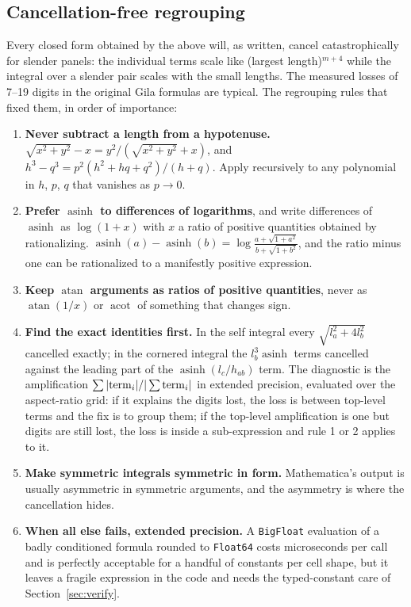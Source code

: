 \documentclass[11pt]{article}
\theoremstyle{remark}
\newcommand{\asinh}{\operatorname{asinh}}
\newcommand{\atan}{\operatorname{atan}}
\newcommand{\code}[1]{\texttt{#1}}
\begin{document}
\subsection{Cancellation-free regrouping}
\label{sec:regroup}

Every closed form obtained by the above will, as written, cancel catastrophically for
slender panels: the individual terms scale like (largest length)$^{m+4}$ while the
integral over a slender pair scales with the small lengths. The measured losses of
7--19 digits in the original Gila formulas are typical. The regrouping rules that
fixed them, in order of importance:
\begin{enumerate}[nosep]
\item \textbf{Never subtract a length from a hypotenuse.} $\sqrt{x^2+y^2} - x =
y^2/(\sqrt{x^2+y^2}+x)$, and $h^3 - q^3 = p^2(h^2+hq+q^2)/(h+q)$. Apply recursively
to any polynomial in $h$, $p$, $q$ that vanishes as $p\to 0$.
\item \textbf{Prefer $\asinh$ to differences of logarithms}, and write differences
of $\asinh$ as $\log(1 + x)$ with $x$ a ratio of positive quantities obtained by
rationalizing. $\asinh(a) - \asinh(b) = \log\frac{a + \sqrt{1+a^2}}{b + \sqrt{1+b^2}}$,
and the ratio minus one can be rationalized to a manifestly positive expression.
\item \textbf{Keep $\atan$ arguments as ratios of positive quantities}, never as
$\atan(1/x)$ or $\operatorname{acot}$ of something that changes sign.
\item \textbf{Find the exact identities first.} In the self integral every
$\sqrt{l_a^2+4l_b^2}$ cancelled exactly; in the cornered integral the $l_b^3\asinh$
terms cancelled against the leading part of the $\asinh(l_c/h_{ab})$ term. The
diagnostic is the amplification $\sum|{\rm term}_i|/|\sum{\rm term}_i|$ in extended
precision, evaluated over the aspect-ratio grid: if it explains the digits lost, the
loss is between top-level terms and the fix is to group them; if the top-level
amplification is one but digits are still lost, the loss is inside a sub-expression
and rule 1 or 2 applies to it.
\item \textbf{Make symmetric integrals symmetric in form.} Mathematica's output is
usually asymmetric in symmetric arguments, and the asymmetry is where the
cancellation hides.
\item \textbf{When all else fails, extended precision.} A \code{BigFloat}
evaluation of a badly conditioned formula rounded to \code{Float64} costs
microseconds per call and is perfectly acceptable for a handful of constants per
cell shape, but it leaves a fragile expression in the code and needs the typed-constant
care of Section~\ref{sec:verify}.
\end{enumerate}
\end{document}
